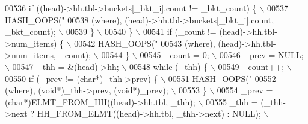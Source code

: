 \begin{DoxyCode}
{{{{00536 \textcolor{preprocessor}{      if ((head)->hh.tbl->buckets[\_bkt\_i].count !=  \_bkt\_count) \{                \(\backslash\)}
00537 \textcolor{preprocessor}{        HASH\_OOPS("%
00538 \textcolor{preprocessor}{            (where), (head)->hh.tbl->buckets[\_bkt\_i].count, \_bkt\_count);         \(\backslash\)}
00539 \textcolor{preprocessor}{      \}                                                                          \(\backslash\)}
00540 \textcolor{preprocessor}{    \}                                                                            \(\backslash\)}
00541 \textcolor{preprocessor}{    if (\_count != (head)->hh.tbl->num\_items) \{                                   \(\backslash\)}
00542 \textcolor{preprocessor}{      HASH\_OOPS("%
00543 \textcolor{preprocessor}{          (where), (head)->hh.tbl->num\_items, \_count);                           \(\backslash\)}
00544 \textcolor{preprocessor}{    \}                                                                            \(\backslash\)}
00545 \textcolor{preprocessor}{    \_count = 0;                                                                  \(\backslash\)}
00546 \textcolor{preprocessor}{    \_prev = NULL;                                                                \(\backslash\)}
00547 \textcolor{preprocessor}{    \_thh =  &(head)->hh;                                                         \(\backslash\)}
00548 \textcolor{preprocessor}{    while (\_thh) \{                                                               \(\backslash\)}
00549 \textcolor{preprocessor}{      \_count++;                                                                  \(\backslash\)}
00550 \textcolor{preprocessor}{      if (\_prev != (char*)\_thh->prev) \{                                          \(\backslash\)}
00551 \textcolor{preprocessor}{        HASH\_OOPS("%
00552 \textcolor{preprocessor}{            (where), (void*)\_thh->prev, (void*)\_prev);                           \(\backslash\)}
00553 \textcolor{preprocessor}{      \}                                                                          \(\backslash\)}
00554 \textcolor{preprocessor}{      \_prev = (char*)ELMT\_FROM\_HH((head)->hh.tbl, \_thh);                         \(\backslash\)}
00555 \textcolor{preprocessor}{      \_thh = (\_thh->next ? HH\_FROM\_ELMT((head)->hh.tbl, \_thh->next) : NULL);     \(\backslash\)}
}}}}}}}
\end{DoxyCode}
